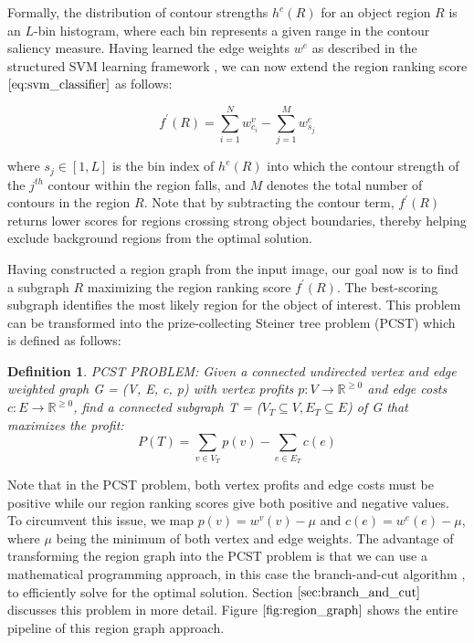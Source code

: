 \documentclass{SMBV12}
\newtheorem{definition}{Definition}
\begin{document}
Formally, the distribution of contour strengths $h^e(R)$ for an object region $R$ is an $L$-bin histogram, where each bin represents a given range in the contour saliency measure. Having learned the edge weights $w^e$ as described in the structured SVM learning framework \cite{tsochantaridis2006large}, we can now extend the region ranking score $\ref{eq:svm_classifier}$ as follows:

\begin{equation}
f^{\prime}(R) = \sum\limits_{i = 1}^{N} w^v_{c_i} - \sum\limits_{j = 1}^{M} w^e_{s_j}
\end{equation}

where $s_j \in [1, L]$ is the bin index of $h^e(R)$ into which the contour strength of the $j^{th}$ contour within the region falls, and $M$ denotes the total number of contours in the region $R$. Note that by subtracting the contour term, $f^{\prime}(R)$ returns lower scores for regions crossing strong object boundaries, thereby helping exclude background regions from the optimal solution.

Having constructed a region graph from the input image, our goal now is to find a subgraph $R$ maximizing the region ranking score $f^\prime(R)$. The best-scoring subgraph identifies the most likely region for the object of interest. This problem can be transformed into the prize-collecting Steiner tree problem (PCST) which is defined as follows:

\begin{definition}
PCST PROBLEM: Given a connected undirected vertex and edge weighted graph G = (V, E, c, p) with vertex profits $p: V \rightarrow \mathbb{R}^{\geq 0}$ and edge costs $c: E \rightarrow \mathbb{R}^{\geq 0}$, find a connected subgraph T = ($V_T \subseteq V, E_T \subseteq E$) of G that maximizes the profit:
\begin{equation}
P(T) = \sum\limits_{v \in V_T} p(v) - \sum\limits_{e \in E_T} c(e)
\end{equation}
\end{definition}

Note that in the PCST problem, both vertex profits and edge costs must be positive while our region ranking scores give both positive and negative values. To circumvent this issue, we map $p(v) = w^v(v) - \mu$ and $c(e) = w^e(e) - \mu$, where $\mu$ being the minimum of both vertex and edge weights. The advantage of transforming the region graph into the PCST problem is that we can use a mathematical programming approach, in this case the branch-and-cut algorithm \cite{ljubic2006algorithmic}, to efficiently solve for the optimal solution. Section $\ref{sec:branch_and_cut}$ discusses this problem in more detail. Figure $\ref{fig:region_graph}$ shows the entire pipeline of this region graph approach.
\end{document}
